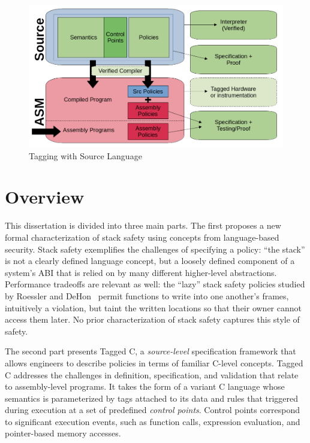 \begin{figure}
  \includegraphics[width=\textwidth]{chapter1/Structure.png}
  \caption{Tagging with Source Language}
  \label{ch1:fig:language}
\end{figure}
        
\section{Overview}

This dissertation is divided into three main parts. The first proposes a new formal characterization
of stack safety using concepts from language-based security. Stack safety exemplifies the challenges
of specifying a policy: ``the stack'' is not a clearly defined language concept, but a loosely
defined component of a system's ABI that is relied on by many different higher-level abstractions.
Performance tradeoffs are relevant as well: the ``lazy'' stack safety policies studied by
Roessler and DeHon~\cite{RoesslerD18} permit functions to write into one another's
frames, intuitively a violation, but taint the written locations so that their owner cannot
access them later. No prior characterization of stack safety captures this style of safety.

The second part presents Tagged C, a \emph{source-level} specification framework that allows
engineers to describe policies in terms of familiar C-level concepts. Tagged C addresses the
challenges in definition, specification, and validation that relate to assembly-level programs.
It takes the form of a variant C language whose semantics is parameterized by tags
attached to its data and rules that triggered during execution at a set of predefined
\emph{control points}. Control points correspond to significant execution events, such as
function calls, expression evaluation, and pointer-based memory accesses.

